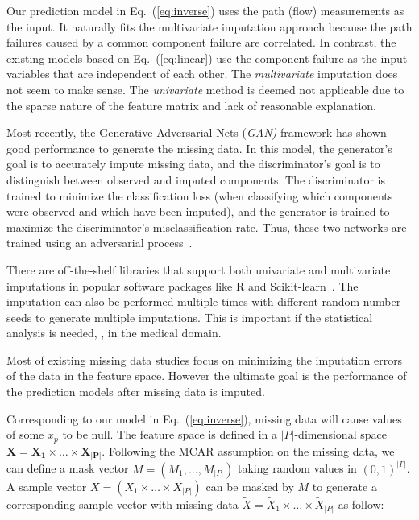 Our prediction model in Eq.~(\ref{eq:inverse})  uses the path (flow) measurements as the input. It naturally fits the multivariate imputation approach 
because the path failures caused by a common component failure are correlated. In contrast, the existing models based on Eq.~(\ref{eq:linear}) use the 
component failure as the input variables that are independent of each other. The {\it multivariate} imputation does not seem to make sense.
The {\it univariate} method is deemed not applicable due to the sparse nature of the feature matrix and lack of reasonable explanation.

Most recently,  the Generative Adversarial Nets ({\it GAN)} framework has shown good performance to generate the missing data.
In this model, the generator’s goal is to accurately impute missing data, and the discriminator’s goal is to distinguish between observed and imputed 
components. The discriminator is trained to minimize the classification loss (when classifying which components were observed and 
which have been imputed), and the generator is trained to maximize the discriminator’s misclassification rate. Thus, these 
two networks are trained using an adversarial process~\cite{Yoon2018GAINMD,Awan2021ImputationOM}.

There are off-the-shelf libraries that support both univariate and multivariate imputations in popular software packages like R and 
Scikit-learn~\cite{JSSv045i03,10.1371/journal.pone.0254720}. The imputation can also be performed multiple times with different 
random number seeds to generate multiple imputations. This is important if the statistical analysis is needed, \eg, in the medical domain. 

Most of existing missing data studies focus on minimizing the imputation errors of the data in the feature space. However the ultimate goal 
is the performance of the prediction models after missing data is imputed.

Corresponding to our model in Eq.~(\ref{eq:inverse}), missing data will cause values of some $x_p$ to be null. 
The feature space is defined in a $|P|$-dimensional space $\mathbf{X} = \mathbf{X_1} \times \ldots \times \mathbf{X_{|P|}}$. 
Following the MCAR assumption 
on the missing data, we can define a mask vector $M = (M_1, \ldots, M_{|P|})$ taking random values in ${(0, 1)}^{|P|}$.  
A sample vector $X = (X_1 \times \ldots \times X_{|P|})$ 
can be masked by $M$ to generate a corresponding sample vector with missing data $\tilde{X} = \tilde{X}_1 \times \ldots \times \tilde{X}_{|P|}$ as follow:

